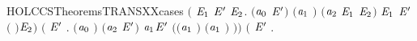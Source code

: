 \begin{SaveVerbatim}{HOLCCSTheoremsTRANSXXcases}
     \ensuremath{(}\HOLSymConst{\HOLTokenExists{}}  \ensuremath{\HOLBoundVar{E}\sb{\mathrm{1}}} \ensuremath{\HOLBoundVar{E}\sp{\prime{}}} \ensuremath{\HOLBoundVar{E}\sb{\mathrm{2}}}.
        \ensuremath{(}\ensuremath{\HOLBoundVar{a}\sb{\mathrm{0}}} \HOLSymConst{\ensuremath{=}}  \HOLSymConst{\ensuremath{\mid}} \ensuremath{\HOLBoundVar{E}\sp{\prime{}}}\ensuremath{)} \HOLSymConst{\HOLTokenConj{}} \ensuremath{(}\ensuremath{\HOLBoundVar{a}\sb{\mathrm{1}}} \HOLSymConst{\ensuremath{=}} \HOLConst{\ensuremath{\tau}}\ensuremath{)} \HOLSymConst{\HOLTokenConj{}} \ensuremath{(}\ensuremath{\HOLBoundVar{a}\sb{\mathrm{2}}} \HOLSymConst{\ensuremath{=}} \ensuremath{\HOLBoundVar{E}\sb{\mathrm{1}}} \HOLSymConst{\ensuremath{\mid}} \ensuremath{\HOLBoundVar{E}\sb{\mathrm{2}}}\ensuremath{)} \HOLSymConst{\HOLTokenConj{}}
         \HOLTokenTransBegin{} \HOLTokenTransEnd \ensuremath{\HOLBoundVar{E}\sb{\mathrm{1}}} \HOLSymConst{\HOLTokenConj{}} \ensuremath{\HOLBoundVar{E}\sp{\prime{}}} \HOLTokenTransBegin{} \ensuremath{(} \ensuremath{)}\HOLTokenTransEnd \ensuremath{\HOLBoundVar{E}\sb{\mathrm{2}}}\ensuremath{)} \HOLSymConst{\HOLTokenDisj{}}
     \ensuremath{(}\HOLSymConst{\HOLTokenExists{}} \ensuremath{\HOLBoundVar{E}\sp{\prime{}}}  .
        \ensuremath{(}\ensuremath{\HOLBoundVar{a}\sb{\mathrm{0}}} \HOLSymConst{\ensuremath{=}}   \ensuremath{)} \HOLSymConst{\HOLTokenConj{}} \ensuremath{(}\ensuremath{\HOLBoundVar{a}\sb{\mathrm{2}}} \HOLSymConst{\ensuremath{=}}   \ensuremath{\HOLBoundVar{E}\sp{\prime{}}}\ensuremath{)} \HOLSymConst{\HOLTokenConj{}}  \HOLTokenTransBegin\ensuremath{\HOLBoundVar{a}\sb{\mathrm{1}}}\HOLTokenTransEnd \ensuremath{\HOLBoundVar{E}\sp{\prime{}}} \HOLSymConst{\HOLTokenConj{}}
        \ensuremath{(}\ensuremath{(}\ensuremath{\HOLBoundVar{a}\sb{\mathrm{1}}} \HOLSymConst{\ensuremath{=}} \HOLConst{\ensuremath{\tau}}\ensuremath{)} \HOLSymConst{\HOLTokenDisj{}} \ensuremath{(}\ensuremath{\HOLBoundVar{a}\sb{\mathrm{1}}} \HOLSymConst{\ensuremath{=}}  \ensuremath{)} \HOLSymConst{\HOLTokenConj{}}  \HOLConst{\HOLTokenNotIn{}}  \HOLSymConst{\HOLTokenConj{}}   \HOLConst{\HOLTokenNotIn{}} \ensuremath{)}\ensuremath{)} \HOLSymConst{\HOLTokenDisj{}}
     \ensuremath{(}\HOLSymConst{\HOLTokenExists{}}  \ensuremath{\HOLBoundVar{E}\sp{\prime{}}} .

\end{SaveVerbatim}
